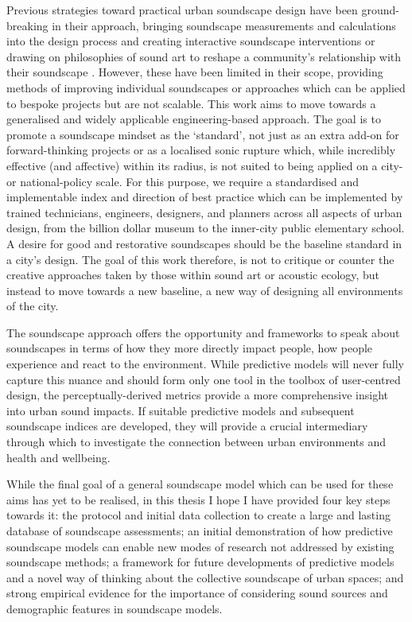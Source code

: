 Previous strategies toward practical urban soundscape design have been ground-breaking in their approach, bringing soundscape measurements and calculations into the design process \citep{SchulteFortkamp2008Using,SchulteFortkamp2016When} and creating interactive soundscape interventions \citep{Steele2021Bringing} or drawing on philosophies of sound art to reshape a community's relationship with their soundscape \citep{Lacey2019Noise}. However, these have been limited in their scope, providing methods of improving individual soundscapes or approaches which can be applied to bespoke projects but are not scalable. This work aims to move towards a generalised and widely applicable engineering-based approach. The goal is to promote a soundscape mindset as the `standard', not just as an extra add-on for forward-thinking projects or as a localised sonic rupture which, while incredibly effective (and affective) within its radius, is not suited to being applied on a city- or national-policy scale. For this purpose, we require a standardised and implementable index and direction of best practice which can be implemented by trained technicians, engineers, designers, and planners across all aspects of urban design, from the billion dollar museum to the inner-city public elementary school. A desire for good and restorative soundscapes should be the baseline standard in a city's design. The goal of this work therefore, is not to critique or counter the creative approaches taken by those within sound art or acoustic ecology, but instead to move towards a new baseline, a new way of designing all environments of the city.

The soundscape approach offers the opportunity and frameworks to speak about soundscapes in terms of how they more directly impact people, how people experience and react to the environment. While predictive models will never fully capture this nuance and should form only one tool in the toolbox of user-centred design, the perceptually-derived metrics provide a more comprehensive insight into urban sound impacts. If suitable predictive models and subsequent soundscape indices are developed, they will provide a crucial intermediary through which to investigate the connection between urban environments and health and wellbeing. 

While the final goal of a general soundscape model which can be used for these aims has yet to be realised, in this thesis I hope I have provided four key steps towards it: the protocol and initial data collection to create a large and lasting database of soundscape assessments; an initial demonstration of how predictive soundscape models can enable new modes of research not addressed by existing soundscape methods; a framework for future developments of predictive models and a novel way of thinking about the collective soundscape of urban spaces; and strong empirical evidence for the importance of considering sound sources and demographic features in soundscape models.